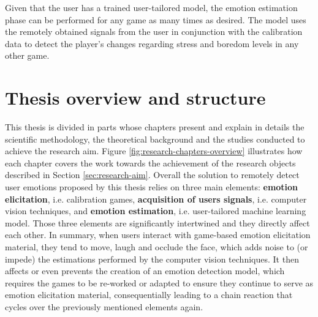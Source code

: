 Given that the user has a trained user-tailored model, the emotion estimation phase can be performed for any game as many times as desired. The model uses the remotely obtained signals from the user in conjunction with the calibration data to detect the player's changes regarding stress and boredom levels in any other game.


\section{Thesis overview and structure}

This thesis is divided in parts whose chapters present and explain in details the scientific methodology, the theoretical background and the studies conducted to achieve the research aim. Figure \ref{fig:research-chapters-overview} illustrates how each chapter covers the work towards the achievement of the research objects described in Section \ref{sec:research-aim}. Overall the solution to remotely detect user emotions proposed by this thesis relies on three main elements: \textbf{emotion elicitation}, i.e. calibration games, \textbf{acquisition of users signals}, i.e. computer vision techniques, and \textbf{emotion estimation}, i.e. user-tailored machine learning model. Those three elements are significantly intertwined and they directly affect each other. In summary, when users interact with game-based emotion elicitation material, they tend to move, laugh and occlude the face, which adds noise to (or impede) the estimations performed by the computer vision techniques. It then affects or even prevents the creation of an emotion detection model, which requires the games to be re-worked or adapted to ensure they continue to serve as emotion elicitation material, consequentially leading to a chain reaction that cycles over the previously mentioned elements again.

